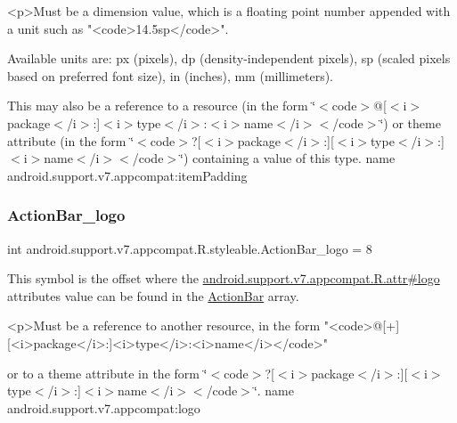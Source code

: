 \begin{DoxyVerb}      <p>Must be a dimension value, which is a floating point number appended with a unit such as "<code>14.5sp</code>".
\end{DoxyVerb}
 Available units are\+: px (pixels), dp (density-\/independent pixels), sp (scaled pixels based on preferred font size), in (inches), mm (millimeters). 

This may also be a reference to a resource (in the form \char`\"{}$<$code$>$@\mbox{[}$<$i$>$package$<$/i$>$\+:\mbox{]}$<$i$>$type$<$/i$>$\+:$<$i$>$name$<$/i$>$$<$/code$>$\char`\"{}) or theme attribute (in the form \char`\"{}$<$code$>$?\mbox{[}$<$i$>$package$<$/i$>$\+:\mbox{]}\mbox{[}$<$i$>$type$<$/i$>$\+:\mbox{]}$<$i$>$name$<$/i$>$$<$/code$>$\char`\"{}) containing a value of this type.  name android.\+support.\+v7.\+appcompat\+:item\+Padding \mbox{\label{classandroid_1_1support_1_1v7_1_1appcompat_1_1R_1_1styleable_af3aef2f5b7b75893c09e942708608f9c}} 
\subsubsection{\texorpdfstring{Action\+Bar\+\_\+logo}{ActionBar\_logo}}
{\footnotesize\ttfamily int android.\+support.\+v7.\+appcompat.\+R.\+styleable.\+Action\+Bar\+\_\+logo = 8\hspace{0.3cm}{\ttfamily [static]}}

This symbol is the offset where the \hyperlink{classandroid_1_1support_1_1v7_1_1appcompat_1_1R_1_1attr_a112ee2368699d6914bca0aa5ac9bb096}{android.\+support.\+v7.\+appcompat.\+R.\+attr\#logo} attribute\textquotesingle{}s value can be found in the \hyperlink{classandroid_1_1support_1_1v7_1_1appcompat_1_1R_1_1styleable_a5941dc15714398e9ec9afaa0155cc1cf}{Action\+Bar} array.

\begin{DoxyVerb}      <p>Must be a reference to another resource, in the form "<code>@[+][<i>package</i>:]<i>type</i>:<i>name</i></code>"
\end{DoxyVerb}
 or to a theme attribute in the form \char`\"{}$<$code$>$?\mbox{[}$<$i$>$package$<$/i$>$\+:\mbox{]}\mbox{[}$<$i$>$type$<$/i$>$\+:\mbox{]}$<$i$>$name$<$/i$>$$<$/code$>$\char`\"{}.  name android.\+support.\+v7.\+appcompat\+:logo \mbox{\label{classandroid_1_1support_1_1v7_1_1appcompat_1_1R_1_1styleable_a6970d0c5badc93f2c02b15104e119735}} 

